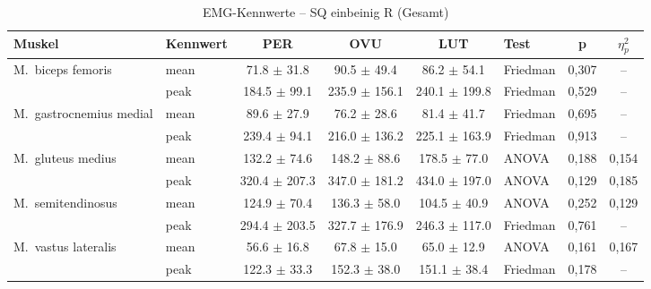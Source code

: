 \begin{table}[H]
  \centering
  \caption{EMG-Kennwerte – SQ einbeinig R (Gesamt)}
  \label{tab:SQ_einbeinig_R_Gesamt}
  \small
  \begin{tabular}{l l c c c l c c}
    \hline
    \textbf{Muskel} & \textbf{Kennwert} & \textbf{PER} & \textbf{OVU} & \textbf{LUT} & \textbf{Test} & \textbf{p} & \textbf{$\eta^2_p$} \\
    \hline
    M.~biceps femoris & mean & 71.8 $\pm$ 31.8 & 90.5 $\pm$ 49.4 & 86.2 $\pm$ 54.1 & Friedman & 0{,}307 & -- \\
     & peak & 184.5 $\pm$ 99.1 & 235.9 $\pm$ 156.1 & 240.1 $\pm$ 199.8 & Friedman & 0{,}529 & -- \\
    \hline
    M.~gastrocnemius medial & mean & 89.6 $\pm$ 27.9 & 76.2 $\pm$ 28.6 & 81.4 $\pm$ 41.7 & Friedman & 0{,}695 & -- \\
     & peak & 239.4 $\pm$ 94.1 & 216.0 $\pm$ 136.2 & 225.1 $\pm$ 163.9 & Friedman & 0{,}913 & -- \\
    \hline
    M.~gluteus medius & mean & 132.2 $\pm$ 74.6 & 148.2 $\pm$ 88.6 & 178.5 $\pm$ 77.0 & ANOVA & 0{,}188 & 0{,}154 \\
     & peak & 320.4 $\pm$ 207.3 & 347.0 $\pm$ 181.2 & 434.0 $\pm$ 197.0 & ANOVA & 0{,}129 & 0{,}185 \\
    \hline
    M.~semitendinosus & mean & 124.9 $\pm$ 70.4 & 136.3 $\pm$ 58.0 & 104.5 $\pm$ 40.9 & ANOVA & 0{,}252 & 0{,}129 \\
     & peak & 294.4 $\pm$ 203.5 & 327.7 $\pm$ 176.9 & 246.3 $\pm$ 117.0 & Friedman & 0{,}761 & -- \\
    \hline
    M.~vastus lateralis & mean & 56.6 $\pm$ 16.8 & 67.8 $\pm$ 15.0 & 65.0 $\pm$ 12.9 & ANOVA & 0{,}161 & 0{,}167 \\
     & peak & 122.3 $\pm$ 33.3 & 152.3 $\pm$ 38.0 & 151.1 $\pm$ 38.4 & Friedman & 0{,}178 & -- \\
    \hline
  \end{tabular}
\end{table}

